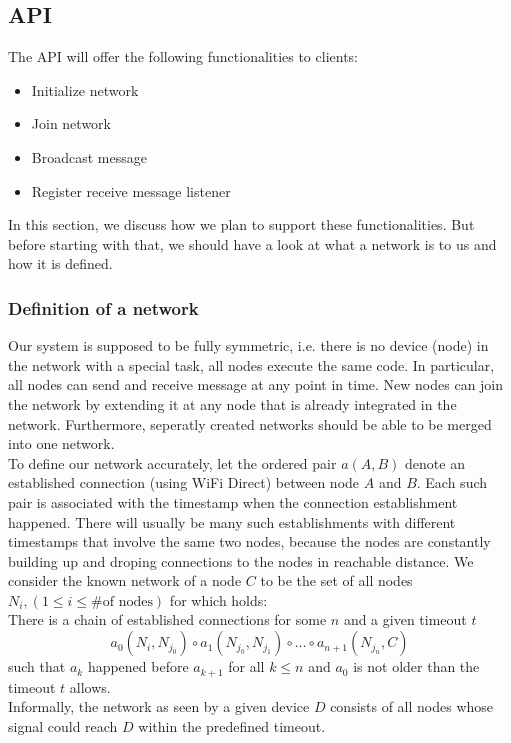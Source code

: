 \subsection{API}
	The API will offer the following functionalities to clients:
	\begin{itemize}
		\item {Initialize network}
		\item {Join network}
		\item {Broadcast message}
		\item {Register receive message listener}
	\end{itemize}
	
	In this section, we discuss how we plan to support these functionalities. But before starting with that, we should have a look at	what a network is to us and how it is defined.\\
	\subsubsection{Definition of a network}
	Our system is supposed to be fully symmetric, i.e. there is no device (node) in the network with a special task, all nodes execute the same code. In particular, all nodes can send and receive message at any point in time. New nodes can join the network by extending it at any node that is already integrated in the network. Furthermore, seperatly created networks should be able to be merged into one network.\\
	To define our network accurately, let the ordered pair $a(A,B)$ denote an established connection (using WiFi Direct) between node $A$ and $B$. Each such pair is associated with the timestamp when the connection establishment happened. There will usually be many such establishments with different timestamps that involve the same two nodes, because the nodes are constantly building up and droping connections to the nodes in reachable distance. We consider the known network of a node $C$ to be the set of all nodes $N_i, (1 \leq i \leq \text{\# of nodes})$ for which holds:  \\
	There is a chain of established connections for some $n$ and a given timeout $t$
	\begin{displaymath}
		a_0(N_{i},N_{j_0}) \circ a_1(N_{j_0},N_{j_1}) \circ \ldots \circ a_{n+1}(N_{j_n},C)
	\end{displaymath}
	such that $a_k$ happened before $a_{k+1}$ for all $k \leq n$ and $a_0$ is not older than the timeout $t$ allows. \\
	Informally, the network as seen by a given device $D$ consists of all nodes whose signal could reach $D$ within the predefined timeout. \\ 
	
